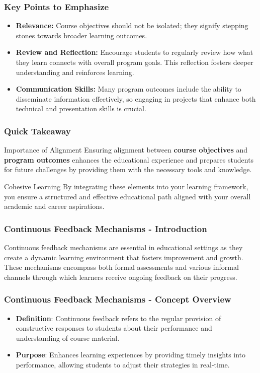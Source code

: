 \documentclass[aspectratio=169]{beamer}
\begin{document}
\begin{frame}[fragile]
    \frametitle{Key Points to Emphasize}
    \begin{itemize}
        \item \textbf{Relevance:} Course objectives should not be isolated; they signify stepping stones towards broader learning outcomes.
        
        \item \textbf{Review and Reflection:} Encourage students to regularly review how what they learn connects with overall program goals. This reflection fosters deeper understanding and reinforces learning.
        
        \item \textbf{Communication Skills:} Many program outcomes include the ability to disseminate information effectively, so engaging in projects that enhance both technical and presentation skills is crucial.
    \end{itemize}
\end{frame}

\begin{frame}[fragile]
    \frametitle{Quick Takeaway}
    \begin{block}{Importance of Alignment}
        Ensuring alignment between \textbf{course objectives} and \textbf{program outcomes} enhances the educational experience and prepares students for future challenges by providing them with the necessary tools and knowledge.
    \end{block}

    \begin{block}{Cohesive Learning}
        By integrating these elements into your learning framework, you ensure a structured and effective educational path aligned with your overall academic and career aspirations.
    \end{block}
\end{frame}

\begin{frame}[fragile]
    \frametitle{Continuous Feedback Mechanisms - Introduction}
    Continuous feedback mechanisms are essential in educational settings as they create a dynamic learning environment that fosters improvement and growth. These mechanisms encompass both formal assessments and various informal channels through which learners receive ongoing feedback on their progress.

\end{frame}

\begin{frame}[fragile]
    \frametitle{Continuous Feedback Mechanisms - Concept Overview}
    \begin{itemize}
        \item \textbf{Definition}: Continuous feedback refers to the regular provision of constructive responses to students about their performance and understanding of course material. 
        \item \textbf{Purpose}: Enhances learning experiences by providing timely insights into performance, allowing students to adjust their strategies in real-time.
    \end{itemize}
\end{frame}
\end{document}
